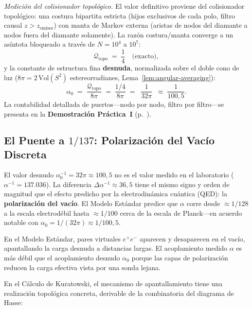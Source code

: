 \documentclass[11pt, a4paper, openany]{book}
\begin{document}
\emph{Medici\'on del colisionador topol\'ogico.}
El valor definitivo proviene del colisionador topol\'ogico: una costura
bipartita estricta (hijos exclusivos de cada polo, filtro causal
$z > z_{\text{emisor}}$) con manta de Markov externa (aristas de nodos
del diamante a nodos fuera del diamante solamente).
La raz\'on costura/manta converge a un as\'intota bloqueado a trav\'es
de $N = 10^4$ a $10^7$:
\begin{equation}
  \mathcal{Q}_{\mathrm{topo}}
  \;=\; \frac{1}{4} \quad\text{(exacto)},
  \label{eq:qtopo-analytical}
\end{equation}
y la constante de estructura fina \textbf{desnuda}, normalizada sobre
el doble cono de luz ($8\pi = 2\,\mathrm{Vol}(S^2)$ estereorradianes,
Lema~\ref{lem:angular-averaging}):
\begin{equation}
  \alpha_0
  \;=\; \frac{\mathcal{Q}_{\mathrm{topo}}}{8\pi}
  \;=\; \frac{1/4}{8\pi}
  \;=\; \boxed{\;\frac{1}{32\pi}\;}
  \;\approx\; \frac{1}{100{,}5}.
  \label{eq:alpha-bare}
\end{equation}
La contabilidad detallada de puertos---nodo por nodo, filtro por
filtro---se presenta en la \textbf{Demostraci\'on Pr\'actica~I}
(p.~\pageref{sec:demo-alpha}).

\subsection{El Puente a $1/137$: Polarizaci\'on del Vac\'io Discreta}
\label{subsec:vacuum-polarization}

El valor desnudo $\alpha_0^{-1} = 32\pi \approx 100{,}5$ no es el valor medido en el
laboratorio ($\alpha^{-1} = 137{.}036$). La diferencia
$\Delta\alpha^{-1} \approx 36{,}5$ tiene el mismo signo y orden de
magnitud que el efecto predicho por la electrodin\'amica cu\'antica
(QED): la \textbf{polarizaci\'on del vac\'io}.
El Modelo Est\'andar predice que $\alpha$ corre desde
$\approx 1/128$ a la escala electrod\'ebil hasta $\approx 1/100$
cerca de la escala de Planck---en acuerdo notable con
$\alpha_0 = 1/(32\pi) \approx 1/100{,}5$.

En el Modelo Est\'andar, pares virtuales $e^+e^-$ aparecen y
desaparecen en el vac\'io, apantallando la carga desnuda a distancias
largas. El acoplamiento medido $\alpha$ es m\'as d\'ebil que el
acoplamiento desnudo $\alpha_0$ porque las capas de polarizaci\'on
reducen la carga efectiva vista por una sonda lejana.

\medskip\noindent
En el C\'alculo de Kuratowski, el mecanismo de apantallamiento tiene
una realizaci\'on topol\'ogica concreta, derivable de la combinatoria
del diagrama de Hasse:
\end{document}
